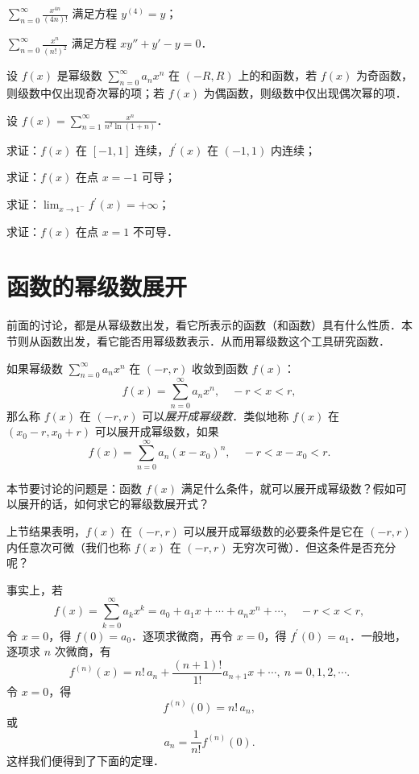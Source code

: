\begin{xiti}
\begin{ziti}
\item $\displaystyle\sum_{n=0}^{\infty}\frac{x^{4n}}{(4n)!}$ 满足方程 $y^{(4)}=y$；
\item $\displaystyle\sum_{n=0}^{\infty}\frac{x^{n}}{(n!)^{2}}$ 满足方程 $xy''+y'-y=0$．
\end{ziti}
\item 设 $f(x)$ 是幂级数 $\displaystyle\sum_{n=0}^{\infty}a_{n}x^{n}$ 在 $(-R,R)$ 上的和函数，若 $f(x)$ 为奇函数，则级数中仅出现奇次幂的项；若 $f(x)$ 为偶函数，则级数中仅出现偶次幂的项．
\item 设 $\displaystyle f(x)=\sum_{n=1}^{\infty}\frac{x^{n}}{n^{2}\ln(1+n)}$．
\begin{ziti}
\item 求证：$f(x)$ 在 $[-1,1]$ 连续，$f^{\prime}(x)$ 在 $(-1,1)$ 内连续；
\item 求证：$f(x)$ 在点 $x=-1$ 可导；
\item 求证：$\displaystyle\lim_{x\to 1^{-}}f^{\prime}(x)=+\infty$；
\item 求证：$f(x)$ 在点 $x=1$ 不可导．
\end{ziti}
\end{xiti}

\section{函数的幂级数展开}

前面的讨论，都是从幂级数出发，看它所表示的函数（和函数）具有什么性质．本节则从函数出发，看它能否用幂级数表示．从而用幂级数这个工具研究函数．

如果幂级数 $\displaystyle\sum_{n=0}^{\infty}a_{n}x^{n}$ 在 $(-r,r)$ 收敛到函数 $f(x)$：
\[
f(x)=\sum_{n=0}^{\infty}a_{n}x^{n},\quad -r<x<r,
\]
那么称 $f(x)$ 在 $(-r,r)$ 可以\emph{展开成幂级数}．类似地称 $f(x)$ 在 $(x_{0}-r,x_{0}+r)$ 可以展开成幂级数，如果
\[
f(x)=\sum_{n=0}^{\infty}a_{n}(x-x_{0})^{n},\quad -r<x-x_{0}<r.
\]

本节要讨论的问题是：函数 $f(x)$ 满足什么条件，就可以展开成幂级数？假如可以展开的话，如何求它的幂级数展开式？

上节结果表明，$f(x)$ 在 $(-r,r)$ 可以展开成幂级数的必要条件是它在 $(-r,r)$ 内任意次可微（我们也称 $f(x)$ 在 $(-r,r)$ 无穷次可微）．但这条件是否充分呢？

事实上，若
\[
f(x)=\sum_{k=0}^{\infty}a_{k}x^{k}=a_{0}+a_{1}x+\cdots+a_{n}x^{n}+\cdots,\quad -r<x<r,
\]
令 $x=0$，得 $f(0)=a_{0}$．逐项求微商，再令 $x=0$，得 $f^{\prime}(0)=a_{1}$．一般地，逐项求 $n$ 次微商，有
\[
f^{(n)}(x)=n!\,a_{n}+\frac{(n+1)!}{1!}a_{n+1}x+\cdots,\ n=0,1,2,\cdots.
\]
令 $x=0$，得
\[
f^{(n)}(0)=n!\,a_{n},
\]
或
\[
a_{n}=\frac{1}{n!}f^{(n)}(0).
\]
这样我们便得到了下面的定理．

